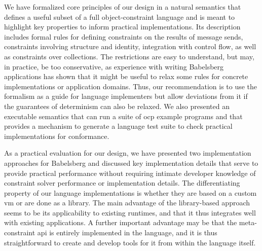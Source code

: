 We have formalized core principles of our design in a natural semantics that
defines a useful subset of a full object-constraint language and is meant to
highlight key properties to inform practical
implementations. %
Its description includes formal rules for defining constraints on the results of
message sends, constraints involving structure and identity, integration with
control flow, as well as constraints over collections. The restrictions are easy
to understand, but may, in practice, be too conservative, as experience with
writing Babelsberg applications has shown that it might be useful to relax some
rules for concrete implementations or application domains. Thus, our
recommendation is to use the formalism as a guide for language implementers but
allow deviations from it if the guarantees of determinism can also be
relaxed. We also presented an executable semantics that can run a suite of
\ac{ocp} example programs and that provides a mechanism to generate a language
test suite to check practical implementations for conformance.

As a practical evaluation for our design, we have presented two implementation
approaches for Babelsberg and discussed key implementation details that serve to
provide practical performance without requiring intimate developer knowledge of
constraint solver performance or implementation details. The differentiating
property of our language implementations is whether they are based on a custom
\ac{vm} or are done as a library. The main advantage of the library-based
approach seems to be its applicability to existing runtimes, and that it thus
integrates well with existing applications. A further important advantage may be
that the meta-constraint \ac{api} is entirely implemented in the language, and
it is thus straightforward to create and develop tools for it from within the
language itself.

